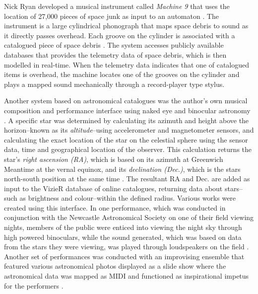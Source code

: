 \documentclass[10pt,a4paper,extrafontsizes]{memoir}
\begin{document}
Nick Ryan developed a musical instrument called \textit{Machine 9} that uses the location of 27,000 pieces of space junk as input to an automaton \cite{spaceDebrisNewScientist}. 
The instrument is a large cylindrical phonograph that maps space debris to sound as it directly passes overhead. Each groove on the cylinder is associated with a catalogued piece of space debris \cite{spaceDebrisYoutube}. The system accesses publicly available databases that provides the telemetry data of space debris, which is then modelled in real-time. When the telemetry data indicates that one of catalogued items is overhead, the machine locates one of the grooves on the cylinder and plays a mapped sound mechanically through a record-player type stylus. 

Another system based on astronomical catalogues was the author's own musical composition and performance interface using naked eye and binocular astronomy \cite{fraietta2014musical}. A specific star was determined by calculating its azimuth and height above the horizon--known as its \textit {altitude}--using  accelerometer and magnetometer sensors, and calculating the exact location of the star on the celestial sphere using the sensor data, time and geographical location of the observer. This calculation returns the star's \textit{right ascension (RA)}, which is based on its azimuth at Greenwich Meantime at the vernal equinox,  and its \textit{declination (Dec.)}, which is the stars north-south position at the same time \cite{duffett2011practical, fraietta2014musical}. The resultant RA and Dec. are added as input to the VizieR database of online catalogues, returning data about stars--such as brightness and colour--within the defined radius. Various works were created using this interface. In one performance, which was  conducted in conjunction with the Newcastle Astronomical Society on one of their field viewing nights, members of the  public were enticed into viewing the night sky through high powered binoculars, while the sound generated, which was  based on data from the stars they were viewing, was played through loudspeakers on the field \cite{fraietta_segue}. 
Another set of performances was conducted with an improvising ensemble that featured various astronomical photos displayed as a slide show where the astronomical data was mapped as MIDI and functioned as inspirational impetus for the performers \cite{BriightSyzygy}. 
\end{document}
